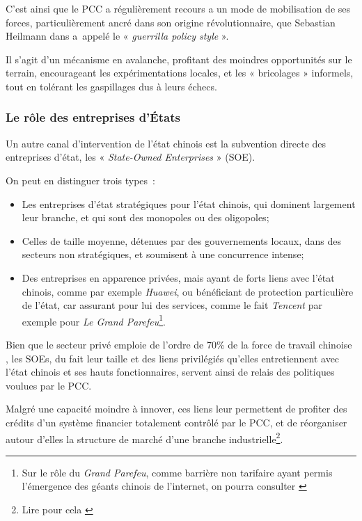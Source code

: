\documentclass[a4paper]{article}
\begin{document}
 C’est ainsi que le PCC a régulièrement recours a un mode de mobilisation de ses forces, particulièrement ancré dans son origine révolutionnaire, que Sebastian Heilmann dans \cite{heilmann18_red} a appelé le « \textit{guerrilla policy style} ».

Il s’agit d’un mécanisme en avalanche, profitant des moindres opportunités sur le terrain, encourageant les expérimentations locales, et les « bricolages » informels, tout en tolérant les gaspillages dus à leurs échecs. 

\subsubsection{Le rôle des entreprises d’États}
\label{sec:org5c8608f}

Un autre canal d’intervention de l’état chinois est la subvention directe des entreprises d’état, les « \textit{State-Owned Enterprises} » (SOE).  

On peut en distinguer trois types~:
\begin{itemize}
\item Les entreprises d’état stratégiques pour l’état chinois, qui dominent largement leur branche, et qui sont des monopoles ou des oligopoles;
\item Celles de taille moyenne, détenues par des gouvernements locaux, dans des secteurs non stratégiques, et soumisent à une concurrence intense;
\item Des entreprises en apparence privées, mais ayant de forts liens avec l’état chinois, comme par exemple \textit{Huawei}, ou bénéficiant de protection particulière de l’état, car assurant pour lui des services, comme le fait \textit{Tencent} par exemple pour \textit{Le Grand Parefeu}\footnote{Sur le rôle du \textit{Grand Parefeu}, comme barrière non tarifaire ayant permis l’émergence des géants chinois de l’internet, on pourra consulter \cite{griffiths19_china}}.
\end{itemize}


Bien que le secteur privé emploie de l’ordre de 70\% de la force de travail chinoise \cite{xiaolan15_chinas}, les SOEs, du fait leur taille et des liens privilégiés qu’elles entretiennent avec l’état chinois et ses hauts fonctionnaires, servent ainsi de relais des politiques voulues par le PCC.

Malgré une capacité moindre à innover, ces liens leur permettent de profiter des crédits d’un système financier totalement contrôlé par le PCC, et de réorganiser autour d’elles la structure de marché d’une branche industrielle\footnote{Lire pour cela \cite{naughton21_rise}}.
\end{document}
